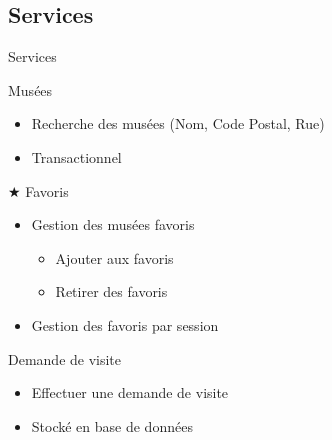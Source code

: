 \FlorentSpeak
\subsection{Services}
\begin{frame}{Services}
	\begin{block}{Musées}
		\begin{itemize}
			\item Recherche des musées (Nom, Code Postal, Rue)
			\item Transactionnel
		\end{itemize}
	\end{block}	
	\vfill
	\pause
	\begin{block}{$\bigstar$ Favoris}
		\begin{itemize}
			\item Gestion des musées favoris
			\begin{itemize}
				\item Ajouter aux favoris
				\item Retirer des favoris
			\end{itemize}
			\item Gestion des favoris par session
		\end{itemize}
	\end{block}
	\pause
	\vfill	
	\begin{block}{Demande de visite}
		\begin{itemize}
			\item Effectuer une demande de visite				
			\item Stocké en base de données
		\end{itemize}
	\end{block}
\end{frame}